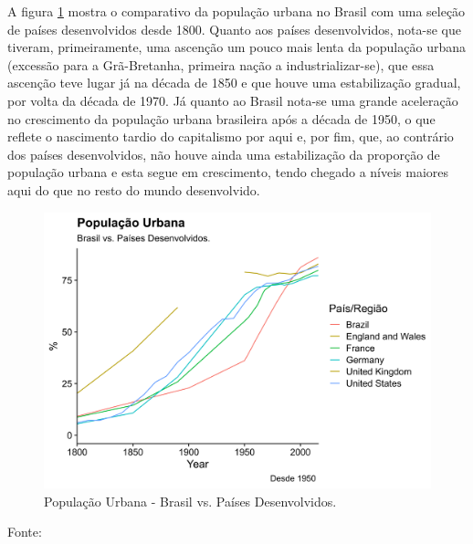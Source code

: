 \documentclass[
	12pt,				%
	oneside,			%
	a4paper,			%
	chapter=TITLE,		%
	section=TITLE,		%
	english,			%
	brazil				%
	]{abntex2}
\newcommand{\bcenter}{\begin{center}}
\newcommand{\ecenter}{\end{center}}
\begin{document}
A figura \ref{fig:pop-urb-brazil-developed} mostra o comparativo da população
urbana no Brasil com uma seleção de países desenvolvidos desde 1800. Quanto aos
países desenvolvidos, nota-se que tiveram, primeiramente, uma ascenção um pouco
mais lenta da população urbana (excessão para a Grã-Bretanha, primeira nação a
industrializar-se), que essa ascenção teve lugar já na década de 1850 e que
houve uma estabilização gradual, por volta da década de 1970. Já quanto ao
Brasil nota-se uma grande aceleração no crescimento da população urbana
brasileira após a década de 1950, o que reflete o nascimento tardio do
capitalismo por aqui e, por fim, que, ao contrário dos países desenvolvidos, não
houve ainda uma estabilização da proporção de população urbana e esta segue em
crescimento, tendo chegado a níveis maiores aqui do que no resto do mundo
desenvolvido.
\begin{figure}[H]

{\centering \includegraphics[width=0.8\linewidth]{images/pop-urb-brazil-developed-1} 

}

\caption{População Urbana - Brasil vs. Países Desenvolvidos.}\label{fig:pop-urb-brazil-developed}
\end{figure}
\bcenter

Fonte: \textcite{doi:10.1177/0959683609356587}
\ecenter
\end{document}

